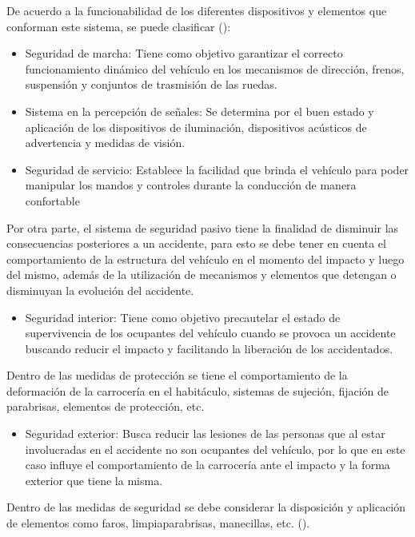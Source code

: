 De acuerdo a la funcionabilidad de los diferentes dispositivos y elementos que conforman este sistema, se puede clasificar (\cite{MT-15}):
\begin{itemize}
	\item Seguridad de marcha: Tiene como objetivo garantizar el correcto funcionamiento dinámico del vehículo en los mecanismos de dirección, frenos, suspensión y conjuntos de trasmisión de las ruedas.

	\item Sistema en la percepción de señales: Se determina por el buen estado y aplicación de los dispositivos de iluminación, dispositivos acústicos de advertencia y medidas de visión.

	\item Seguridad de servicio: Establece la facilidad que brinda el vehículo para poder manipular los mandos y controles durante la conducción de manera confortable
\end{itemize}
Por otra parte, el sistema de seguridad pasivo tiene la finalidad de disminuir las consecuencias posteriores a un accidente, para esto se debe tener en cuenta el comportamiento de la estructura del vehículo en el momento del impacto y luego del mismo, además de la utilización de mecanismos y elementos que detengan o disminuyan la evolución del accidente.\\
\begin{itemize}
	\item
Seguridad interior: Tiene como objetivo precautelar el estado de supervivencia de los ocupantes del vehículo cuando se provoca un accidente buscando reducir el impacto y facilitando la liberación de los accidentados.\\
\end{itemize}

Dentro de las medidas de protección se tiene el comportamiento de la deformación de la carrocería en el habitáculo, sistemas de sujeción, fijación de parabrisas, elementos de protección, etc.\\
\begin{itemize}
	\item
Seguridad exterior: Busca reducir las lesiones de las personas que al estar involucradas en el accidente no son ocupantes del vehículo, por lo que en este caso influye el comportamiento de la carrocería ante el impacto y la forma exterior que tiene la misma.\\
\end{itemize}
Dentro de las medidas de seguridad se debe considerar la disposición y aplicación de elementos como faros, limpiaparabrisas, manecillas, etc. (\cite{MT-15}).


